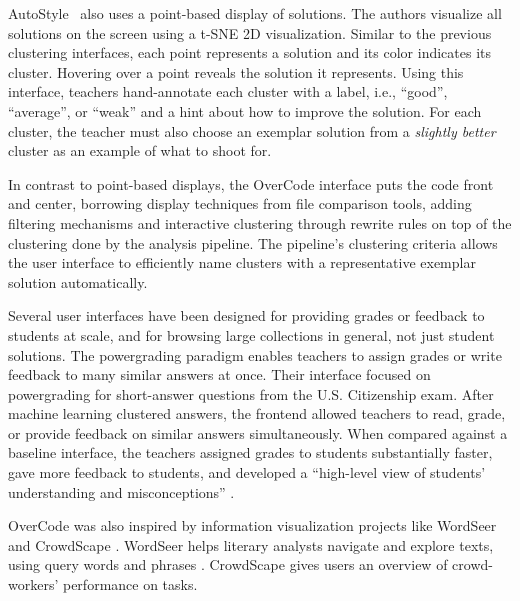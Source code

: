 AutoStyle~\cite{choudhury2016autostyle} also uses a point-based display of solutions. The authors visualize all solutions on the screen using a t-SNE 2D visualization. Similar to the previous clustering interfaces, each point represents a solution and its color indicates its cluster. Hovering over a point reveals the solution it represents. Using this interface, teachers hand-annotate each cluster with a label, i.e., ``good'', ``average'', or ``weak'' and a hint about how to improve the solution. For each cluster, the teacher must also choose an exemplar solution from a {\it slightly better} cluster as an example of what to shoot for.

In contrast to point-based displays, the OverCode interface puts the code front and center, borrowing display techniques from file comparison tools, adding filtering mechanisms and interactive clustering through rewrite rules on top of the clustering done by the analysis pipeline. The pipeline's clustering criteria allows the user interface to efficiently name clusters with a representative exemplar solution automatically.

Several user interfaces have been designed for providing grades or feedback to students at scale, and for browsing large collections in general, not just student solutions. The powergrading paradigm \cite{basupowergrading} enables teachers to assign grades or write feedback to many similar answers at once. Their interface focused on powergrading for short-answer questions from the U.S. Citizenship exam. After machine learning clustered answers, the frontend allowed teachers to read, grade, or provide feedback on similar answers simultaneously. When compared against a baseline interface, the teachers assigned grades to students substantially faster, gave more feedback to students, and developed a ``high-level view of students' understanding and misconceptions'' \cite{basuDivideAndConquer}.

OverCode was also inspired by information visualization projects like WordSeer \cite{wordseerlitcomp13,wordseercikm13} and CrowdScape \cite{crowdscape}. WordSeer helps literary analysts navigate and explore texts, using query words and phrases \cite{wordseerhcir11}. CrowdScape gives users an overview of crowd-workers’ performance on tasks.


